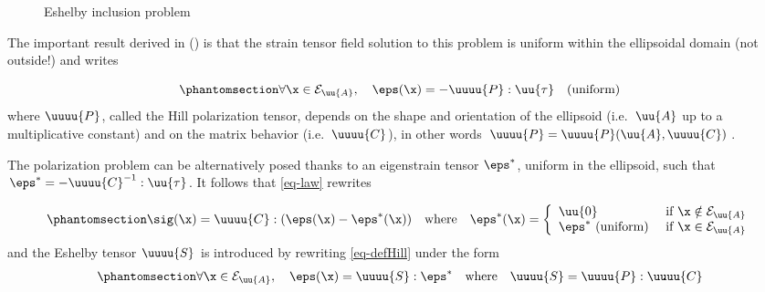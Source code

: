 \documentclass[
  letterpaper,
  DIV=11,
  numbers=noendperiod]{scrreprt}
\begin{document}
\begin{figure}


\caption{\label{fig-eurlerangles}Eshelby inclusion problem}

\end{figure}%

The important result derived in () is that the strain tensor field solution to this problem is
uniform within the ellipsoidal domain (not outside!) and writes

\begin{equation}\phantomsection\label{eq-defHill}{
   \forall \x \in \mathcal{E}_{\uu{A}},\quad \eps(\x)=-\uuuu{P}:\uu{\tau}\quad\textrm{(uniform)}
}\end{equation} where \(\uuuu{P}\), called the Hill polarization tensor,
depends on the shape and orientation of the ellipsoid (i.e.~\(\uu{A}\)
up to a multiplicative constant) and on the matrix behavior
(i.e.~\(\uuuu{C}\)), in other words
\(\uuuu{P}=\uuuu{P}(\uu{A},\uuuu{C})\).

The polarization problem can be alternatively posed thanks to an
eigenstrain tensor \(\eps^*\), uniform in the ellipsoid, such that
\(\eps^*=-\uuuu{C}^{-1}:\uu{\tau}\). It follows that \ref{eq-law}
rewrites

\begin{equation}\phantomsection\label{eq-law2}{
    \sig(\x)=\uuuu{C}:(\eps(\x)-\eps^*(\x))\quad\textrm{where}\quad
    \eps^*(\x)=
    \left\{
    \begin{array}{ll}
    \uu{0}&\textrm{ if }\x \notin \mathcal{E}_{\uu{A}}\\
    \eps^*\textrm{ (uniform)}&\textrm{ if }\x \in \mathcal{E}_{\uu{A}}
    \end{array}
    \right.
}\end{equation} and the Eshelby tensor \(\uuuu{S}\) is introduced by
rewriting \ref{eq-defHill} under the form
\begin{equation}\phantomsection\label{eq-defEshelby}{
   \forall \x \in \mathcal{E}_{\uu{A}},\quad \eps(\x)=\uuuu{S}:\eps^*\quad\textrm{where}\quad\uuuu{S}=\uuuu{P}:\uuuu{C}
}\end{equation}
\end{document}
